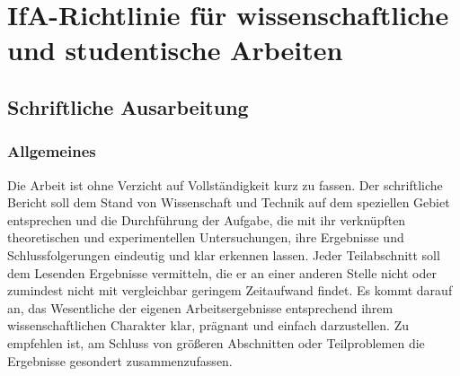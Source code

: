 
\chapter{IfA-Richtlinie für wissenschaftliche und studentische Arbeiten}
\label{sec:IfARichtlinieFuerWissenschaftlicheUndStudentischeArbeiten}


\section{Schriftliche Ausarbeitung}
\label{sec:SchriftlicheAusarbeitung}

\subsection{Allgemeines}
\label{sec:Allgemeines2}

Die Arbeit ist ohne Verzicht auf Vollständigkeit kurz zu fassen. Der schriftliche Bericht soll dem Stand von Wissenschaft und Technik auf dem speziellen Gebiet entsprechen und die Durchführung der Aufgabe, die mit ihr verknüpften theoretischen und experimentellen Untersuchungen, ihre Ergebnisse und Schlussfolgerungen eindeutig und klar erkennen lassen. Jeder Teilabschnitt soll dem Lesenden Ergebnisse vermitteln, die er an einer anderen Stelle nicht oder zumindest nicht mit vergleichbar geringem Zeitaufwand findet. Es kommt darauf an, das Wesentliche der eigenen Arbeitsergebnisse entsprechend ihrem wissenschaftlichen Charakter klar, prägnant und einfach darzustellen. Zu empfehlen ist, am Schluss von größeren Abschnitten oder Teilproblemen die Ergebnisse gesondert zusammenzufassen.

